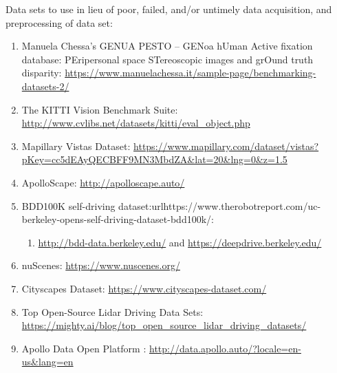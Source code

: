 \documentclass[letter,12pt]{article}
\begin{document}
Data sets to use in lieu of poor, failed, and/or untimely data acquisition, and preprocessing of data set: \vspace{-0.3cm}
\begin{enumerate} \itemsep -4pt
\item Manuela Chessa's GENUA PESTO -- GENoa hUman Active fixation database: PEripersonal space STereoscopic images and grOund truth disparity: \url{https://www.manuelachessa.it/sample-page/benchmarking-datasets-2/}
\item The KITTI Vision Benchmark Suite: \url{http://www.cvlibs.net/datasets/kitti/eval_object.php}
\item Mapillary Vistas Dataset: \url{https://www.mapillary.com/dataset/vistas?pKey=cc5dEAyQECBFF9MN3MbdZA&lat=20&lng=0&z=1.5}
\item ApolloScape: \url{http://apolloscape.auto/}
\item BDD100K self-driving dataset:url{https://www.therobotreport.com/uc-berkeley-opens-self-driving-dataset-bdd100k/}: \vspace{-0.3cm}
	\begin{enumerate} \itemsep -2pt
	\item \url{http://bdd-data.berkeley.edu/} and \url{https://deepdrive.berkeley.edu/}
	\end{enumerate}
\item nuScenes: \url{https://www.nuscenes.org/}
\item Cityscapes Dataset: \url{https://www.cityscapes-dataset.com/}
\item Top Open-Source Lidar Driving Data Sets: \url{https://mighty.ai/blog/top_open_source_lidar_driving_datasets/}
\item Apollo Data Open Platform : \url{http://data.apollo.auto/?locale=en-us&lang=en}
\end{enumerate}









%
%
%

{\linespread{1}


}
\end{document}
